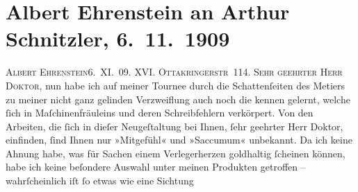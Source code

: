 

         
         \renewcommand{\erwaehntePersonen}{Personen: Albert Ehrenstein, Samuel Fischer}
         \renewcommand{\erwaehnteOrte}{Orte: Ottakringerstraße, Wien}
         \renewcommand{\erwaehnteWerke}{Werke: Die neue Rundschau, Mitgefühl, Saccumum}
               \section[Albert Ehrenstein an Arthur Schnitzler, 6. 11. 1909]{ Albert Ehrenstein an Arthur Schnitzler, 6. 11. 1909}\nopagebreak{}\rehead{ }\begin{ledgroupsized}[t]{13cm}\normalsize\beginnumbering{} \toendnotes[C]{\smallbreak\pagebreak[2]} 
\pstart
           {\pb}\textsc{Albert Ehrenstein}\hfill 6. XI. 09. \pend
           \pstart
           \textsc{XVI. Ottakringerstr 114.}\pend
           \pstart{}\textsc{Sehr geehrter Herr Doktor,}\pend\pstart
           nun habe ich auf meiner Tournee durch die Schattenſeiten des Metiers zu meiner nicht
               ganz gelinden Verzweiflung auch noch die kennen gelernt, welche ſich in
               Maſchinenfräuleins und deren Schreibfehlern verkörpert. Von den Arbeiten, die ſich in
               dieſer Neugeſtaltung bei Ihnen, ſehr geehrter Herr Doktor, einfinden, ſind Ihnen nur
                  »Mitgefühl« und »Saccumum« unbekannt.\pend
           \pstart
           Da ich keine Ahnung habe, was für Sachen einem Verlegerherzen goldhaltig ſcheinen
               können, habe ich keine beſondere Auswahl {\pb}unter meinen Produkten getroffen – wahrſcheinlich iſt ſo etwas wie eine Sichtung

\end{ledgroupsized}
